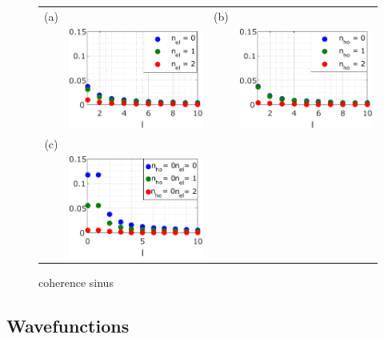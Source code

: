 \begin{figure}[hptb]
	\begin{center}
		\begin{tabular}{c c c c}
			(a) & & (b) & \\ 
			& \includegraphics[width = 6.5 cm]{./appC/JnlData_sinus_Projected_Gradient_Method_coh_el_el} & & \includegraphics[width = 6.5 cm]{./appC/JnlData_sinus_Projected_Gradient_Method_coh_ho_ho} \\
			(c) & & & \\
			& \includegraphics[width = 6.5 cm]{./appC/JnlData_sinus_Projected_Gradient_Method_coh_el_ho} & & 
		\end{tabular}
	\end{center}
	
	\caption{coherence sinus}
	\label{fig: coherence sinus}
\end{figure}

\subsection{Wavefunctions}


